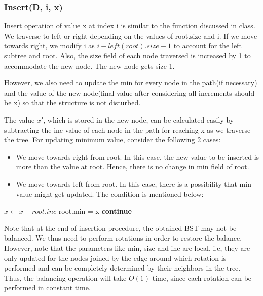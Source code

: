 \documentclass{article}
\begin{document}
\subsubsection{Insert(D, i, x)}

Insert operation of value x at index i is similar to the function discussed in class. We traverse to left or right depending on the values of root.size and i. If we move towards right, we modify i as $i - left(root).size - 1$ to account for the left subtree and root. Also, the size field of each node traversed is increased by 1 to accommodate the new node. The new node gets size 1.
\par
However, we also need to update the min for every node in the path(if necessary) and the value of the new node(final value after considering all increments should be x) so that the structure is not disturbed. 
\par
The value $x'$, which is stored in the new node, can be calculated easily by subtracting the inc value of each node in the path for reaching x as we traverse the tree. For updating minimum value, consider the following 2 cases:
\begin{itemize}
	\item We move towards right from root. In this case, the new value to be inserted is more than the value at root. Hence, there is no change in min field of root.
	
	\item We move towards left from root. In this case, there is a possibility that min value might get updated. The condition is mentioned below:

\end{itemize} 
	\begin{algorithm}
		\begin{algorithmic}
			\State $x \gets x - root.inc$
			\State root.min = x
			\Else
			\State \textbf{continue}
			\EndIf
		\end{algorithmic}
	\end{algorithm}
	Note that at the end of insertion procedure, the obtained BST may not be balanced. We thus need to perform rotations in order to restore the balance. However, note that the parameters like min, size and inc are local, i.e, they are only updated for the nodes joined by the edge around which rotation is performed and can be completely determined by their neighbors in the tree. Thus, the balancing operation will take $O(1)$ time, since each rotation can be performed in constant time.
	
\end{document}

